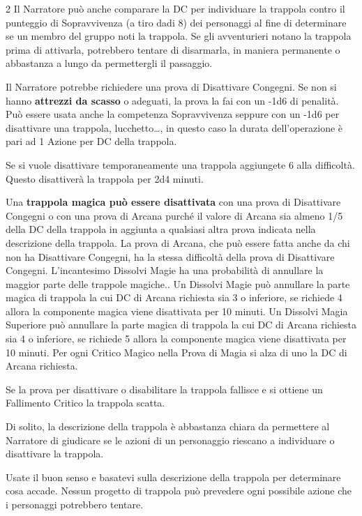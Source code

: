 \begin{multicols}{2}
Il Narratore può anche comparare la DC per individuare la trappola contro il punteggio di Sopravvivenza (a tiro dadi 8) dei personaggi al fine di determinare se un membro del gruppo noti la trappola. Se gli avventurieri notano la trappola prima di attivarla, potrebbero tentare di disarmarla, in maniera permanente o abbastanza a lungo da permettergli il passaggio.

Il Narratore potrebbe richiedere una prova di Disattivare Congegni. Se non si hanno \textbf{attrezzi da scasso} o adeguati, la prova la fai con un -1d6 di penalità. Può essere usata anche la competenza Sopravvivenza seppure con un -1d6 per disattivare una trappola, lucchetto…, in questo caso la durata dell'operazione è pari ad 1 Azione per DC della trappola.

Se si vuole disattivare temporaneamente una trappola aggiungete 6 alla difficoltà. Questo disattiverà la trappola per 2d4 minuti.

Una \textbf{trappola magica può essere disattivata} con una prova di Disattivare Congegni o con una prova di Arcana purché il valore di Arcana sia almeno 1/5 della DC della trappola in aggiunta a qualsiasi altra prova indicata nella descrizione della trappola. La prova di Arcana, che può essere fatta anche da chi non ha Disattivare Congegni, ha la stessa difficoltà della prova di  Disattivare Congegni. L'incantesimo Dissolvi Magie ha una probabilità di annullare la maggior parte delle trappole magiche.. Un Dissolvi Magie può annullare la parte magica di trappola la cui DC di Arcana richiesta sia 3 o inferiore, se richiede 4 allora la componente magica viene disattivata per 10 minuti. Un Dissolvi Magia Superiore può annullare la parte magica di trappola la cui DC di Arcana richiesta sia 4 o inferiore, se richiede 5 allora la componente magica viene disattivata per 10 minuti. Per ogni Critico Magico nella Prova di Magia si alza di uno la DC di Arcana richiesta.

Se la prova per disattivare o disabilitare la trappola fallisce e si ottiene un Fallimento Critico la trappola scatta.

Di solito, la descrizione della trappola è abbastanza chiara da permettere al Narratore di giudicare se le azioni di un personaggio riescano a individuare o disattivare la trappola.

Usate il buon senso e basatevi sulla descrizione della trappola per determinare cosa accade. Nessun progetto di trappola può prevedere ogni possibile azione che i personaggi potrebbero tentare.


\end{multicols}

